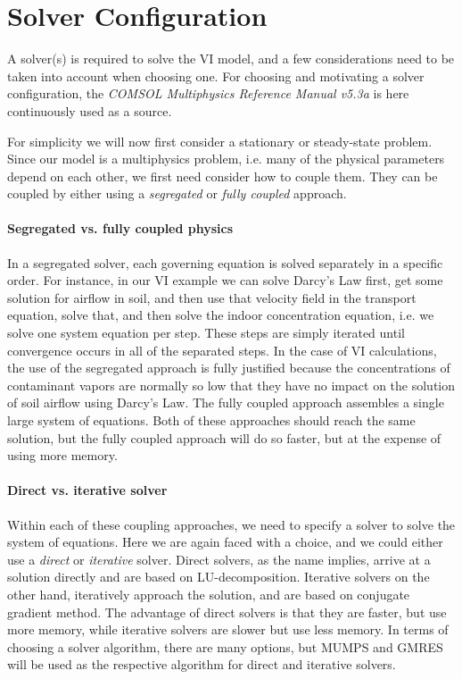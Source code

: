 \section{Solver Configuration}

A solver(s) is required to solve the VI model, and a few considerations need to be taken into account when choosing one.
For choosing and motivating a solver configuration, the \textit{COMSOL Multiphysics Reference Manual v5.3a}\cite{comsol_comsol_nodate} is here continuously used as a source.\par

For simplicity we will now first consider a stationary or steady-state problem.
Since our model is a multiphysics problem, i.e. many of the physical parameters depend on each other, we first need consider how to couple them.
They can be coupled by either using a \textit{segregated} or \textit{fully coupled} approach.\par

\paragraph{Segregated vs. fully coupled physics}

In a segregated solver, each governing equation is solved separately in a specific order.
For instance, in our VI example we can solve Darcy's Law first, get some solution for airflow in soil, and then use that velocity field in the transport equation, solve that, and then solve the indoor concentration equation, i.e. we solve one system equation per step.
These steps are simply iterated until convergence occurs in all of the separated steps.
In the case of VI calculations, the use of the segregated approach is fully justified because the concentrations of contaminant vapors are normally so low that they have no impact on the solution of soil airflow using Darcy's Law.
The fully coupled approach assembles a single large system of equations.
Both of these approaches should reach the same solution, but the fully coupled approach will do so faster, but at the expense of using more memory.\par

\paragraph{Direct vs. iterative solver}

Within each of these coupling approaches, we need to specify a solver to solve the system of equations.
Here we are again faced with a choice, and we could either use a \textit{direct} or \textit{iterative} solver.
Direct solvers, as the name implies, arrive at a solution directly and are based on LU-decomposition.
Iterative solvers on the other hand, iteratively approach the solution, and are based on conjugate gradient method.
The advantage of direct solvers is that they are faster, but use more memory, while iterative solvers are slower but use less memory.
In terms of choosing a solver algorithm, there are many options, but MUMPS and GMRES will be used as the respective algorithm for direct and iterative solvers.\par

